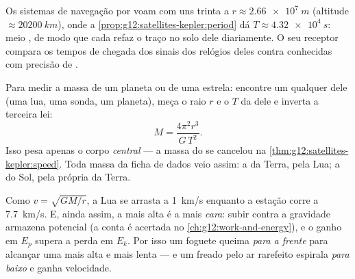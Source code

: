 \begin{example}\label{ex:g12:satellites-kepler:gps}
Os sistemas de navegação por  voam com uns trinta  a
$r \approx \qty{2.66e7}{m}$ (altitude $\approx \qty{20200}{km}$), onde a
\cref{prop:g12:satellites-kepler:period} dá $T \approx \qty{4.32e4}{s}$: meio , de modo que cada  refaz o traço no solo dele diariamente. O seu
receptor compara os tempos de chegada dos sinais dos relógios deles contra 
conhecidas com precisão de .
\end{example}

\begin{method}\label{met:g12:satellites-kepler:weigh}
%
Para medir a massa de um planeta ou de uma estrela: encontre um  qualquer dele
(uma lua, uma sonda, um planeta), meça o raio $r$ e o  $T$ da  dele e
inverta a terceira lei:
\[ M = \frac{4\pi^2 r^3}{G\,T^2}. \]
Isso pesa apenas o corpo \emph{central} --- a massa do  se cancelou na
\cref{thm:g12:satellites-kepler:speed}. Toda massa da ficha de dados veio assim: a da
Terra, pela Lua; a do Sol, pela própria  da Terra.
\end{method}

\begin{remark}\label{rem:g12:satellites-kepler:energy}
Como $v = \sqrt{GM/r}$, a Lua se arrasta a \qty{1}{km/s} enquanto a estação corre a
\qty{7.7}{km/s}. E, ainda assim, a  mais alta é a mais \emph{cara}: subir contra
a gravidade armazena  potencial (a conta é acertada no
\cref{ch:g12:work-and-energy}), e o ganho em $E_p$ supera a perda em $E_k$. Por isso
um foguete queima \emph{para a frente} para alcançar uma  mais alta e mais lenta
--- e um  freado pelo ar rarefeito espirala \emph{para baixo} e ganha
velocidade.
\end{remark}


